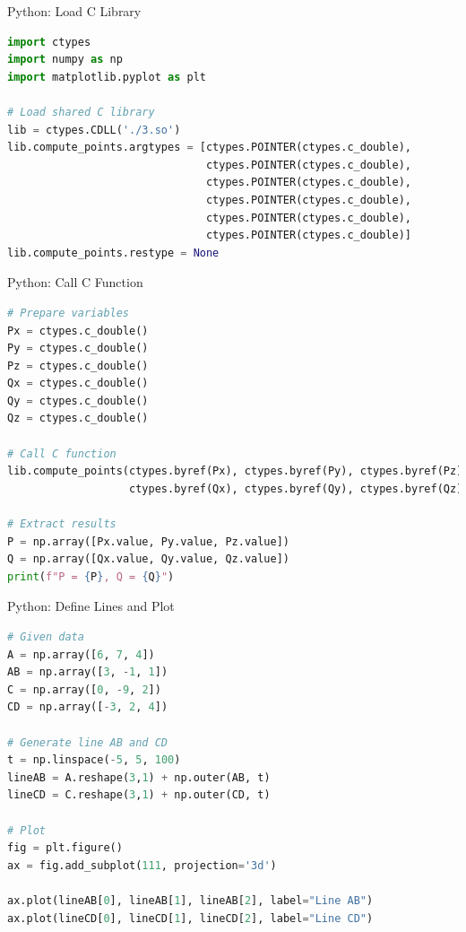 \documentclass{beamer}
\begin{document}
\begin{frame}[fragile]{Python: Load C Library}
\begin{lstlisting}[language=Python]
import ctypes
import numpy as np
import matplotlib.pyplot as plt

# Load shared C library
lib = ctypes.CDLL('./3.so')
lib.compute_points.argtypes = [ctypes.POINTER(ctypes.c_double),
                               ctypes.POINTER(ctypes.c_double),
                               ctypes.POINTER(ctypes.c_double),
                               ctypes.POINTER(ctypes.c_double),
                               ctypes.POINTER(ctypes.c_double),
                               ctypes.POINTER(ctypes.c_double)]
lib.compute_points.restype = None
\end{lstlisting}
\end{frame}

\begin{frame}[fragile]{Python: Call C Function}
\begin{lstlisting}[language=Python]
# Prepare variables
Px = ctypes.c_double()
Py = ctypes.c_double()
Pz = ctypes.c_double()
Qx = ctypes.c_double()
Qy = ctypes.c_double()
Qz = ctypes.c_double()

# Call C function
lib.compute_points(ctypes.byref(Px), ctypes.byref(Py), ctypes.byref(Pz),
                   ctypes.byref(Qx), ctypes.byref(Qy), ctypes.byref(Qz))

# Extract results
P = np.array([Px.value, Py.value, Pz.value])
Q = np.array([Qx.value, Qy.value, Qz.value])
print(f"P = {P}, Q = {Q}")
\end{lstlisting}
\end{frame}

\begin{frame}[fragile]{Python: Define Lines and Plot}
\begin{lstlisting}[language=Python]
# Given data
A = np.array([6, 7, 4])
AB = np.array([3, -1, 1])
C = np.array([0, -9, 2])
CD = np.array([-3, 2, 4])

# Generate line AB and CD
t = np.linspace(-5, 5, 100)
lineAB = A.reshape(3,1) + np.outer(AB, t)
lineCD = C.reshape(3,1) + np.outer(CD, t)

# Plot
fig = plt.figure()
ax = fig.add_subplot(111, projection='3d')

ax.plot(lineAB[0], lineAB[1], lineAB[2], label="Line AB")
ax.plot(lineCD[0], lineCD[1], lineCD[2], label="Line CD")
\end{lstlisting}
\end{frame}
\end{document}
